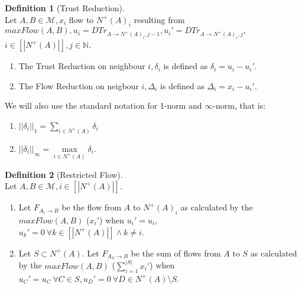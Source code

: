 \documentclass[11pt]{article}
\theoremstyle{definition}
\newtheorem{definition}{Definition}[section]
\theoremstyle{corollary}
\theoremstyle{lemma}
\begin{document}
      \begin{definition}[Trust Reduction] \ \\
         Let $A, B \in \mathcal{M}, x_i$ flow to $N^{+}(A)_i$ resulting from $maxFlow(A,B), u_i =
         DTr_{A \rightarrow N^{+}(A)_i,j-1}, u_i' = DTr_{A \rightarrow N^{+}(A)_i,j},$ \\ $i \in [|N^{+}(A)|],
         j \in \mathbb{N}$.
         \begin{enumerate}
            \item The Trust Reduction on neighbour $i, \delta_i$ is defined as $\delta_i = u_i - u_i'$.
            \item The Flow Reduction on neigbour $i, \Delta_i$ is defined as $\Delta_i = x_i - u_i'$.
         \end{enumerate}
         We will also use the standard notation for 1-norm and $\infty$-norm, that is:
         \begin{enumerate}
            \item $||\delta_i||_1 = \sum\limits_{i \in N^{+}(A)}\delta_i$
            \item $||\delta_i||_\infty = \max\limits_{i \in N^{+}(A)}\delta_i$.
         \end{enumerate}
      \end{definition}
      \begin{definition}[Restricted Flow] \ \\
         Let $A, B \in \mathcal{M}, i \in [|N^{+}(A)|]$.
         \begin{enumerate}
            \item Let $F_{A_i \rightarrow B}$ be the flow from $A$ to $N^{+}(A)_i$ as calculated by the $maxFlow(A,B)$
               ($x_i'$) when $u_i' = u_i,$ \\ $u_k' = 0 \:\forall k \in [|N^{+}(A)|] \wedge k \neq i$.
            \item Let $S \subset N^{+}(A)$. Let $F_{A_S \rightarrow B}$ be the sum of flows from $A$ to $S$ as
               calculated by the $maxFlow(A,B)$ ($\sum\limits_{i=1}^{|S|}x_i'$) when $u_C' = u_C \: \forall C \in S,
               u_D' = 0 \: \forall D \in N^{+}(A) \setminus S$.
         \end{enumerate}
      \end{definition}
\end{document}

